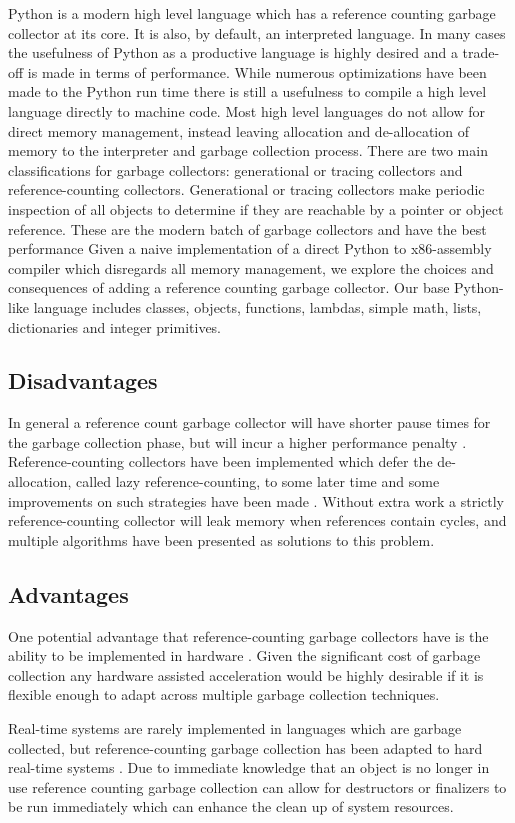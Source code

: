 \documentclass{sigplanconf}
\begin{document}
Python is a modern high level language which has a reference counting garbage collector at its core.  It is also, by default, an interpreted language.  In many cases the usefulness of Python as a productive language is highly desired and a trade-off is made in terms of performance.  While numerous optimizations have been made to the Python run time there is still a usefulness to compile a high level language directly to machine code.  Most high level languages do not allow for direct memory management, instead leaving allocation and de-allocation of memory to the interpreter and garbage collection process.
There are two main classifications for garbage collectors: generational or tracing collectors and reference-counting collectors.  Generational or tracing collectors make periodic inspection of all objects to determine if they are reachable by a pointer or object reference.  These are the modern batch of garbage collectors and have the best performance 
Given a naive implementation of a direct Python to x86-assembly compiler which disregards all memory management, we explore the choices and consequences of adding a reference counting garbage collector.  Our base Python-like language includes classes, objects, functions, lambdas, simple math, lists, dictionaries and integer primitives.
\subsection{Disadvantages}
In general a reference count garbage collector will have shorter pause times for the garbage collection phase, but will incur a higher performance penalty \cite{joisha}\cite{blackburn}.  Reference-counting collectors have been implemented which defer the de-allocation, called lazy reference-counting, to some later time and some improvements on such strategies have been made \cite{boehm}.  Without extra work a strictly reference-counting collector will leak memory when references contain cycles, and multiple algorithms have been presented as solutions to this problem.
\subsection{Advantages}
One potential advantage that reference-counting garbage collectors have is the ability to be implemented in hardware \cite{joao}.  Given the significant cost of garbage collection \cite{hertz} any hardware assisted acceleration would be highly desirable if it is flexible enough to adapt across multiple garbage collection techniques. 
\par
Real-time systems are rarely implemented in languages which are garbage collected, but reference-counting garbage collection has been adapted to hard real-time systems \cite{?}.  Due to immediate knowledge that an object is no longer in use reference counting garbage collection can allow for destructors or finalizers to be run immediately which can enhance the clean up of system resources.
\end{document}
